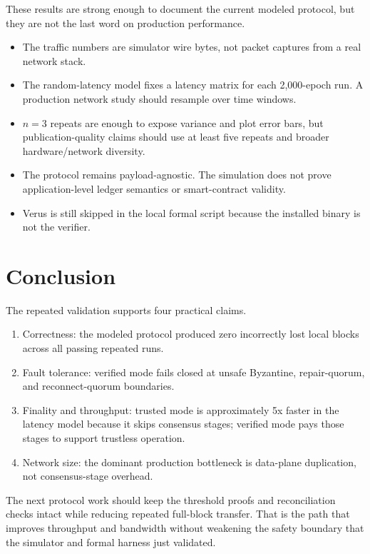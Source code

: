 \documentclass[11pt]{article}
\begin{document}
These results are strong enough to document the current modeled protocol, but
they are not the last word on production performance.

\begin{itemize}
  \item The traffic numbers are simulator wire bytes, not packet captures from
  a real network stack.
  \item The random-latency model fixes a latency matrix for each 2,000-epoch
  run. A production network study should resample over time windows.
  \item \(n=3\) repeats are enough to expose variance and plot error bars, but
  publication-quality claims should use at least five repeats and broader
  hardware/network diversity.
  \item The protocol remains payload-agnostic. The simulation does not prove
  application-level ledger semantics or smart-contract validity.
  \item Verus is still skipped in the local formal script because the installed
  binary is not the verifier.
\end{itemize}

\section{Conclusion}

The repeated validation supports four practical claims.

\begin{enumerate}
  \item Correctness: the modeled protocol produced zero incorrectly lost local
  blocks across all passing repeated runs.
  \item Fault tolerance: verified mode fails closed at unsafe Byzantine,
  repair-quorum, and reconnect-quorum boundaries.
  \item Finality and throughput: trusted mode is approximately 5x faster in the
  latency model because it skips consensus stages; verified mode pays those
  stages to support trustless operation.
  \item Network size: the dominant production bottleneck is data-plane
  duplication, not consensus-stage overhead.
\end{enumerate}

The next protocol work should keep the threshold proofs and reconciliation
checks intact while reducing repeated full-block transfer. That is the path that
improves throughput and bandwidth without weakening the safety boundary that
the simulator and formal harness just validated.
\end{document}
